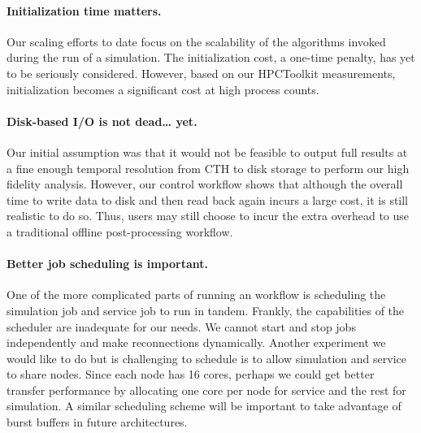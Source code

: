 \paragraph{Initialization time matters.}  Our scaling efforts to date
focus on the scalability of the algorithms invoked during the run of a
simulation.  The initialization cost, a one-time penalty, has yet to be
seriously considered.  However, based on our HPCToolkit measurements,
initialization becomes a significant cost at high process counts.

\paragraph{Disk-based I/O is not dead\ldots{} yet.} Our initial assumption
was that it would not be feasible to output full results at a fine enough
temporal resolution from CTH to disk storage to perform our high fidelity
analysis.  However, our control workflow shows that although the overall
time to write data to disk and then read back again incurs a large cost, it
is still realistic to do so.  Thus, users may still choose to incur the
extra overhead to use a traditional offline post-processing \vda workflow.

\paragraph{Better job scheduling is important.} One of the more complicated
parts of running an \intransit workflow is scheduling the simulation job
and service job to run in tandem.  Frankly, the capabilities of the
scheduler are inadequate for our needs.  We cannot start and stop jobs
independently and make reconnections dynamically.  Another experiment we
would like to do but is challenging to schedule is to allow simulation and
service to share nodes.  Since each node has 16 cores, perhaps we could get
better transfer performance by allocating one core per node for service and
the rest for simulation.  A similar scheduling scheme will be important to
take advantage of burst buffers in future architectures.

